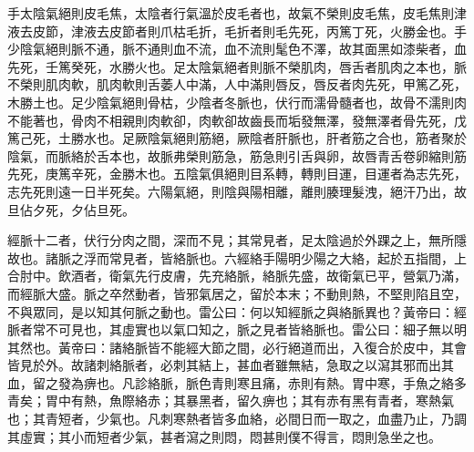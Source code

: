 手太陰氣絕則皮毛焦，太陰者行氣溫於皮毛者也，故氣不榮則皮毛焦，皮毛焦則津液去皮節，津液去皮節者則爪枯毛折，毛折者則毛先死，丙篤丁死，火勝金也。手少陰氣絕則脈不通，脈不通則血不流，血不流則髦色不澤，故其面黑如漆柴者，血先死，壬篤癸死，水勝火也。足太陰氣絕者則脈不榮肌肉，唇舌者肌肉之本也，脈不榮則肌肉軟，肌肉軟則舌萎人中滿，人中滿則唇反，唇反者肉先死，甲篤乙死，木勝土也。足少陰氣絕則骨枯，少陰者冬脈也，伏行而濡骨髓者也，故骨不濡則肉不能著也，骨肉不相親則肉軟卻，肉軟卻故齒長而垢發無澤，發無澤者骨先死，戊篤己死，土勝水也。足厥陰氣絕則筋絕，厥陰者肝脈也，肝者筋之合也，筋者聚於陰氣，而脈絡於舌本也，故脈弗榮則筋急，筋急則引舌與卵，故唇青舌卷卵縮則筋先死，庚篤辛死，金勝木也。五陰氣俱絕則目系轉，轉則目運，目運者為志先死，志先死則遠一日半死矣。六陽氣絕，則陰與陽相離，離則腠理髮洩，絕汗乃出，故旦佔夕死，夕佔旦死。

經脈十二者，伏行分肉之間，深而不見；其常見者，足太陰過於外踝之上，無所隱故也。諸脈之浮而常見者，皆絡脈也。六經絡手陽明少陽之大絡，起於五指間，上合肘中。飲酒者，衛氣先行皮膚，先充絡脈，絡脈先盛，故衛氣已平，營氣乃滿，而經脈大盛。脈之卒然動者，皆邪氣居之，留於本末；不動則熱，不堅則陷且空，不與眾同，是以知其何脈之動也。雷公曰：何以知經脈之與絡脈異也？黃帝曰：經脈者常不可見也，其虛實也以氣口知之，脈之見者皆絡脈也。雷公曰：細子無以明其然也。黃帝曰：諸絡脈皆不能經大節之間，必行絕道而出，入復合於皮中，其會皆見於外。故諸刺絡脈者，必刺其結上，甚血者雖無結，急取之以瀉其邪而出其血，留之發為痹也。凡診絡脈，脈色青則寒且痛，赤則有熱。胃中寒，手魚之絡多青矣；胃中有熱，魚際絡赤；其暴黑者，留久痹也；其有赤有黑有青者，寒熱氣也；其青短者，少氣也。凡刺寒熱者皆多血絡，必間日而一取之，血盡乃止，乃調其虛實；其小而短者少氣，甚者瀉之則悶，悶甚則僕不得言，悶則急坐之也。

